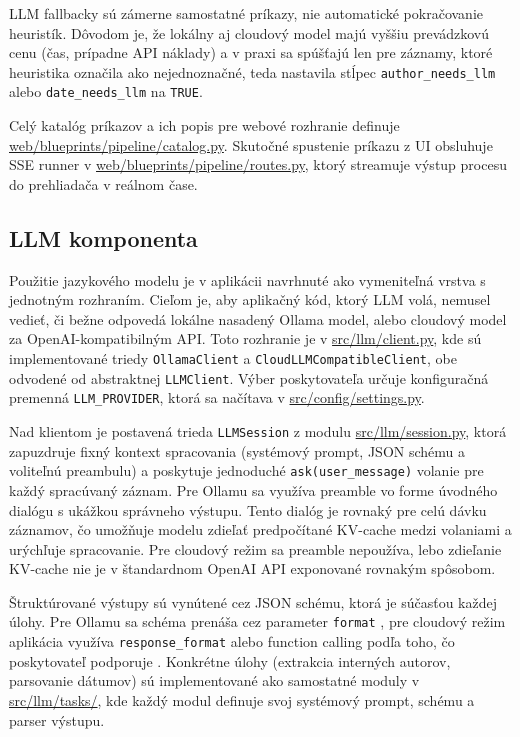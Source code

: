LLM fallbacky sú zámerne samostatné príkazy, nie automatické pokračovanie heuristík. Dôvodom je, že lokálny aj cloudový model majú vyššiu prevádzkovú cenu (čas, prípadne API náklady) a v praxi sa spúšťajú len pre záznamy, ktoré heuristika označila ako nejednoznačné, teda nastavila stĺpec \texttt{author\_needs\_llm} alebo \texttt{date\_needs\_llm} na \texttt{TRUE}.

Celý katalóg príkazov a ich popis pre webové rozhranie definuje \href{web/blueprints/pipeline/catalog.py}{web/blueprints/pipeline/catalog.py}. Skutočné spustenie príkazu z UI obsluhuje SSE runner v \href{web/blueprints/pipeline/routes.py}{web/blueprints/pipeline/routes.py}, ktorý streamuje výstup procesu do prehliadača v reálnom čase.

\subsection{LLM komponenta}

Použitie jazykového modelu je v aplikácii navrhnuté ako vymeniteľná vrstva s jednotným rozhraním. Cieľom je, aby aplikačný kód, ktorý LLM volá, nemusel vedieť, či bežne odpovedá lokálne nasadený Ollama model, alebo cloudový model za OpenAI-kompatibilným API. Toto rozhranie je v \href{src/llm/client.py}{src/llm/client.py}, kde sú implementované triedy \texttt{OllamaClient} a \texttt{CloudLLMCompatibleClient}, obe odvodené od abstraktnej \texttt{LLMClient}. Výber poskytovateľa určuje konfiguračná premenná \texttt{LLM\_PROVIDER}, ktorá sa načítava v \href{src/config/settings.py}{src/config/settings.py}.

Nad klientom je postavená trieda \texttt{LLMSession} z modulu \href{src/llm/session.py}{src/llm/session.py}, ktorá zapuzdruje fixný kontext spracovania (systémový prompt, JSON schému a voliteľnú preambulu) a poskytuje jednoduché \texttt{ask(user\_message)} volanie pre každý spracúvaný záznam. Pre Ollamu sa využíva preamble vo forme úvodného dialógu s ukážkou správneho výstupu. Tento dialóg je rovnaký pre celú dávku záznamov, čo umožňuje modelu zdieľať predpočítané KV-cache medzi volaniami a urýchľuje spracovanie. Pre cloudový režim sa preamble nepoužíva, lebo zdieľanie KV-cache nie je v štandardnom OpenAI API exponované rovnakým spôsobom.

Štruktúrované výstupy sú vynútené cez JSON schému, ktorá je súčasťou každej úlohy. Pre Ollamu sa schéma prenáša cez parameter \texttt{format} \cite{OllamaStructuredOutputs}, pre cloudový režim aplikácia využíva \texttt{response\_format} alebo function calling podľa toho, čo poskytovateľ podporuje \cite{OpenAIStructuredOutputs,OpenAIFunctionCalling}. Konkrétne úlohy (extrakcia interných autorov, parsovanie dátumov) sú implementované ako samostatné moduly v \href{src/llm/tasks/}{src/llm/tasks/}, kde každý modul definuje svoj systémový prompt, schému a parser výstupu.

